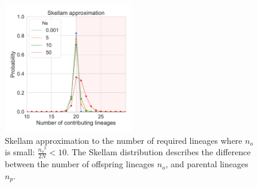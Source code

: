 \documentclass[review,nonatbib]{elsarticle}
\begin{document}
\begin{figure}[H]
  \centering
  \includegraphics[width=0.5\textwidth]{fig/skellam.pdf}
  \caption{Skellam approximation to the number of required lineages where $n_o$ is small:
  $\frac{{n_o}^2}{2N} < 10$. The Skellam distribution describes the difference between the number
  of offspring lineages $n_o$, and parental lineages $n_p$. }
  \label{fig_apx_skellam}
\end{figure}
\end{document}
